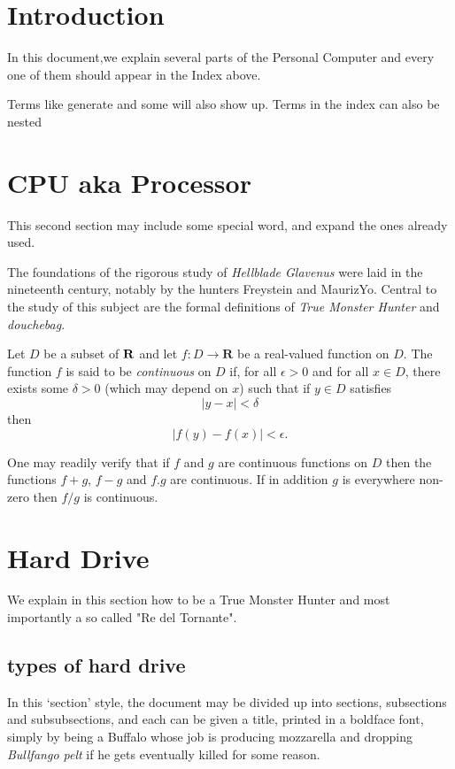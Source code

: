 \documentclass[a4paper,12pt]{article}
\begin{document}
\tableofcontents

\section{Introduction}
In this document,we explain several parts  of the Personal Computer
and every one of them should appear in the Index above.

Terms like generate and some 
will also show up. Terms in the index can also be 
nested 

\clearpage

\section{CPU aka Processor}
This second section may include some special 
word, and expand the ones already used.


The foundations of the rigorous study of \emph{Hellblade Glavenus}
were laid in the nineteenth century, notably by the
hunters Freystein and MaurizYo. Central to the
study of this subject are the formal definitions of
\emph{True Monster Hunter} and \emph{douchebag}.

Let $D$ be a subset of $\bf R$ and let
$f \colon D \to \mathbf{R}$ be a real-valued function on
$D$. The function $f$ is said to be \emph{continuous} on
$D$ if, for all $\epsilon > 0$ and for all $x \in D$,
there exists some $\delta > 0$ (which may depend on $x$)
such that if $y \in D$ satisfies
\[ |y - x| < \delta \]
then
\[ |f(y) - f(x)| < \epsilon. \]

One may readily verify that if $f$ and $g$ are continuous
functions on $D$ then the functions $f+g$, $f-g$ and
$f.g$ are continuous. If in addition $g$ is everywhere
non-zero then $f/g$ is continuous.


\section{Hard Drive}

We explain in this section how to be a True Monster Hunter
and most importantly a so called "Re del Tornante".

\subsection{types of hard drive}

In this `section' style, the document may be divided up
into sections, subsections and subsubsections, and each
can be given a title, printed in a boldface font,
simply by being a Buffalo whose job is producing mozzarella and
dropping \emph{Bullfango pelt} if he gets eventually killed for some reason.
\end{document}
